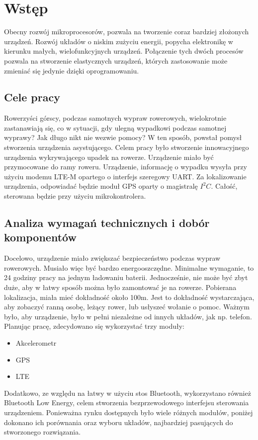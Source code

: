 \chapter{Wstęp}
\label{cha:wstep}

Obecny rozwój mikroprocesorów, pozwala na tworzenie coraz bardziej złożonych urządzeń. Rozwój układów o niskim zużyciu energii, popycha elektronikę w kierunku małych, wielofunkcyjnych urządzeń. Połączenie tych dwóch procesów pozwala na stworzenie elastycznych urządzeń, których zastosowanie może zmieniać się jedynie dzięki oprogramowaniu.


\section{Cele pracy}
\label{sec:celePracy}

Rowerzyści górscy, podczas samotnych wypraw rowerowych, wielokrotnie zastanawiają się, co w sytuacji, gdy ulegną wypadkowi podczas samotnej wyprawy?
Jak długo nikt nie wezwie pomocy? W ten sposób, powstał pomysł stworzenia urządzenia asystującego.
\newline
Celem pracy było stworzenie innowacyjnego urządzenia wykrywającego upadek na rowerze. Urządzenie miało być przymocowane do ramy roweru. Urządzenie, informację o wypadku wysyła przy użyciu modemu LTE-M opartego o interfejs szeregowy UART. Za lokalizowanie urządzenia, odpowiadać będzie moduł GPS oparty o magistralę $I^{2}C$. Całość, sterowana będzie przy użyciu mikrokontrolera.

\section{Analiza wymagań technicznych i dobór komponentów}
\label{sec:technical_analysis}
Docelowo, urządzenie miało zwiększać bezpieczeństwo podczas wypraw rowerowych. Musiało więc być bardzo energooszczędne. Minimalne wymaganie, to 24 godziny pracy na jednym ładowaniu baterii. Jednocześnie, nie może być zbyt duże, aby w łatwy sposób można było zamontować je na rowerze. Pobierana lokalizacja, miała mieć dokładność około 100m. Jest to dokładność wystarczająca, aby zobaczyć ranną osobę, leżący rower, lub usłyszeć wołanie o pomoc. Ważnym było, aby urządzenie, było w pełni niezależne od innych układów, jak np. telefon.
\newline
Planując pracę, zdecydowano się wykorzystać trzy moduły:
\begin{itemize}
    \item Akcelerometr
    \item GPS
    \item LTE
\end{itemize}
Dodatkowo, ze względu na łatwy w użyciu stos Bluetooth, wykorzystano również Bluetooth Low Energy, celem stworzenia bezprzewodowego interfejsu sterowania urządzeniem.
\newline
Ponieważna rynku dostępnych było wiele różnych modułów, poniżej dokonano ich porównania oraz wyboru układów, najbardziej pasujących do stworzonego rozwiązania.

